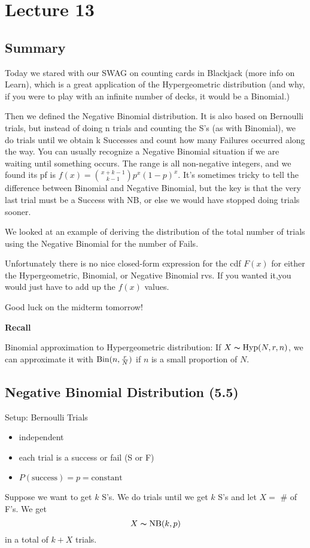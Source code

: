 \section{Lecture 13}
\subsection{Summary}

Today we stared with our SWAG on counting cards in Blackjack (more info on Learn), which is a great application of the Hypergeometric distribution (and why, if you were to play with an infinite number of decks, it would be a Binomial.)

Then we defined the Negative Binomial distribution. It is also based on Bernoulli trials, but instead of doing n trials and counting the S's (as with Binomial), we do trials until we obtain k Successes and count how many Failures occurred along the way. You can usually recognize a Negative Binomial situation if we are waiting until something occurs. The range is all non-negative integers, and we found its pf is $f(x)=\binom{x+k-1}{k-1}p^x(1-p)^x$. It's sometimes tricky to tell the difference between Binomial and Negative Binomial, but the key is that the very last trial must be a Success with NB, or else we would have stopped doing trials sooner.

We looked at an example of deriving the distribution of the total number of trials using the Negative Binomial for the number of Fails.

Unfortunately there is no nice closed-form expression for the cdf $F(x)$ for either the Hypergeometric, Binomial, or Negative Binomial rvs. If you wanted it,you would just have to add up the $f(x)$ values.

Good luck on the midterm tomorrow!

\textbf{Recall}

Binomial approximation to Hypergeometric distribution:
If $ X\thicksim\operatorname{Hyp} (N,r,n) $, we can approximate it with 
$ \operatorname{Bin} (n,\frac{r}{N}) $ if $ n $ is a small proportion of $ N $.

\subsection{Negative Binomial Distribution (5.5)}
Setup: Bernoulli Trials
\begin{itemize}
    \item independent
    \item each trial is a success or fail (S or F)
    \item $ P(\text{success})=p=\text{constant} $ 
\end{itemize}
Suppose we want to get $ k $ S's. We do trials until we get
$ k $ S's and let $ X= $ \# of F's. We get
\[ X\thicksim \operatorname{NB}(k,p) \]
in a total of $ k+X $ trials.


